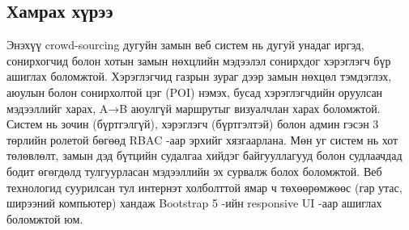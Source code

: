     \subsection*{Хамрах хүрээ}
    Энэхүү crowd-sourcing дугуйн замын веб систем нь дугуй унадаг иргэд, сонирхогчид болон хотын замын нөхцлийн мэдээлэл сонирхдог хэрэглэгч бүр ашиглах боломжтой. Хэрэглэгчид газрын зураг дээр замын нөхцөл тэмдэглэх, аюулын болон сонирхолтой цэг (POI) нэмэх, бусад хэрэглэгчдийн оруулсан мэдээллийг харах, A→B аюулгүй маршрутыг визуалчлан харах боломжтой. Систем нь зочин (бүртгэлгүй), хэрэглэгч (бүртгэлтэй) болон админ гэсэн 3 төрлийн ролетой бөгөөд RBAC -аар эрхийг хязгаарлана.
    Мөн уг систем нь хот төлөвлөлт, замын дэд бүтцийн судалгаа хийдэг байгууллагууд болон судлаачдад бодит өгөгдөлд тулгуурласан мэдээллийн эх сурвалж болох боломжтой. Веб технологид суурилсан тул интернэт холболттой ямар ч төхөөрөмжөөс (гар утас, ширээний компьютер) хандаж Bootstrap 5 -ийн responsive UI -аар ашиглах боломжтой юм.
